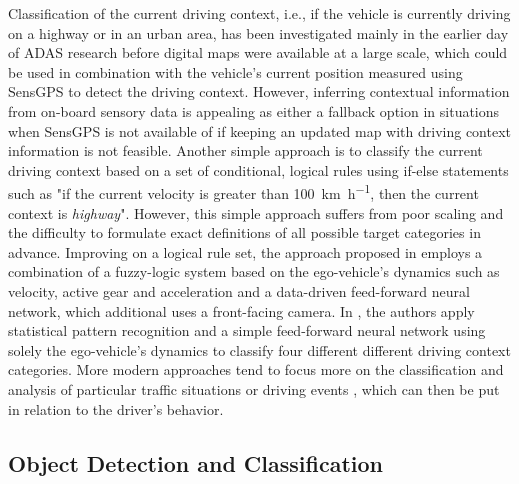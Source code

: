 Classification of the current driving context, i.e., if the vehicle is currently driving on a highway or in an urban area, has been investigated mainly in the earlier day of \ac{ADAS} research before digital maps were available at a large scale, which could be used in combination with the vehicle's current position measured using \ac{SensGPS} to detect the driving context.
However, inferring contextual information from on-board sensory data is appealing as either a fallback option in situations when \ac{SensGPS} is not available of if keeping an updated map with driving context information is not feasible.
Another simple approach is to classify the current driving context based on a set of conditional, logical rules using if-else statements such as "if the current velocity is greater than \SI{100}{\kilo\meter\per\hour}, then the current context is \emph{highway}".
However, this simple approach suffers from poor scaling and the difficulty to formulate exact definitions of all possible target categories in advance.
Improving on a logical rule set, the approach proposed in \cite{Hauptmann1996} employs a combination of a fuzzy-logic system based on the ego-vehicle's dynamics such as velocity, active gear and acceleration and a data-driven feed-forward neural network, which additional uses a front-facing camera.
In \cite{Engstrom2001}, the authors apply statistical pattern recognition and a simple feed-forward neural network using solely the ego-vehicle's dynamics to classify four different different driving context categories.
More modern approaches tend to focus more on the classification and analysis of particular traffic situations \cite{Hermann2008} or driving events \cite{Dagostino2013}, which can then be put in relation to the driver's behavior.

\subsection{Object Detection and Classification}
\label{subsec:obj_detect}

